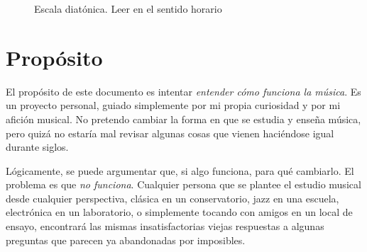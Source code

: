 \documentclass[]{article}
\author{}
\date{}
\begin{document}
\begin{figure}
 \center

  \vspace{12pt}

\caption{Escala diatónica. Leer en el sentido horario}
\label{fig1}
\end{figure}


\tableofcontents

\section{Propósito}

El propósito de este documento es intentar \emph{entender cómo funciona la música}. Es un proyecto personal, guiado simplemente por mi propia curiosidad y por mi afición musical. No pretendo cambiar la forma en que se estudia y enseña música, pero quizá no estaría mal revisar algunas cosas que vienen haciéndose igual durante siglos.

Lógicamente, se puede argumentar que, si algo funciona, para qué cambiarlo. El problema es que \emph{no funciona}. Cualquier persona que se plantee el estudio musical desde cualquier perspectiva, clásica en un conservatorio, jazz en una escuela, electrónica en un laboratorio, o simplemente tocando con amigos en un local de ensayo, encontrará las mismas insatisfactorias viejas respuestas a algunas preguntas que parecen ya abandonadas por imposibles.
\end{document}
